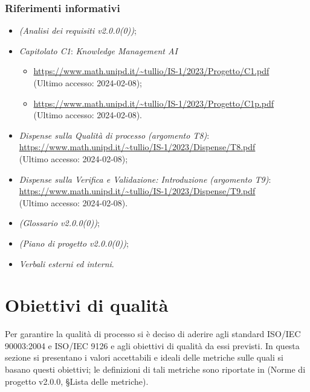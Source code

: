 \documentclass[10pt, a4paper]{article}
\begin{document}
    \subsubsection{Riferimenti informativi}
    \begin{itemize}
        \item \textit{(Analisi dei requisiti v2.0.0(0))};
        \item \textit{Capitolato C1}: \textit{Knowledge Management AI}
        \begin{itemize}
            \item \url{https://www.math.unipd.it/~tullio/IS-1/2023/Progetto/C1.pdf}\\
            (Ultimo accesso: 2024-02-08);
            \item \url{https://www.math.unipd.it/~tullio/IS-1/2023/Progetto/C1p.pdf}\\
            (Ultimo accesso: 2024-02-08).
        \end{itemize}
        \item \textit{Dispense sulla Qualità di processo (argomento T8)}: \\
            \url{https://www.math.unipd.it/~tullio/IS-1/2023/Dispense/T8.pdf}\\
            (Ultimo accesso: 2024-02-08);
        \item \textit{Dispense sulla Verifica e Validazione: Introduzione (argomento T9)}: \\
            \url{https://www.math.unipd.it/~tullio/IS-1/2023/Dispense/T9.pdf}\\
            (Ultimo accesso: 2024-02-08).
        \item \textit{(Glossario v2.0.0(0))};
        \item \textit{(Piano di progetto v2.0.0(0))};
        \item \textit{Verbali esterni ed interni}.
    \end{itemize}

    
\newpage
\section{Obiettivi di qualità}
\label{ObiettiviQualità}
Per garantire la qualità di processo si è deciso di aderire agli standard ISO/IEC 90003:2004 e ISO/IEC 9126 e agli obiettivi di qualità da essi previsti. In questa sezione si presentano i valori accettabili e ideali delle metriche sulle quali si basano questi obiettivi; le definizioni di tali metriche sono riportate in (Norme di progetto v2.0.0, \S Lista delle metriche).
\end{document}
